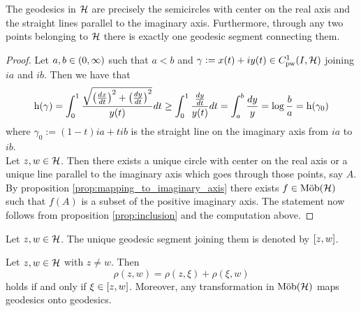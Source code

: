 \begin{theorem}
	The geodesics in $\mathcal{H}$ are precisely the semicircles with center on the real axis and the straight lines parallel to the imaginary axis. Furthermore, through any two points belonging to $\mathcal{H}$ there is exactly one geodesic segment connecting them. 
	\label{thm:geodesics}
\end{theorem}

\begin{proof}
	Let $a,b \in \intoo{0,\infty}$ such that $a < b$ and $\gamma := x(t) + iy(t) \in C^1_{\mathrm{pw}}(I,\mathcal{H})$ joining $ia$ and $ib$. Then we have that
	\begin{equation*}
		\h(\gamma) =  \int_0^1 \frac{\sqrt{\del[1]{\frac{dx}{dt}}^2 + \del[1]{\frac{dy}{dt}}^2}}{y(t)} dt \geq  \int_0^1 \frac{\frac{dy}{dt}}{y(t)} dt = \int_a^b \frac{dy}{y} = \log \frac{b}{a} = \h(\gamma_0)
	\end{equation*}
	\noindent where $\gamma_0 := (1 - t)ia + tib$ is the straight line on the imaginary axis from $ia$ to $ib$.\\
	Let $z,w \in \mathcal{H}$. Then there exists a unique circle with center on the real axis or a unique line parallel to the imaginary axis which goes through those points, say $A$. By proposition \ref{prop:mapping_to_imaginary_axis} there exists $f \in \mathrm{M\ddot{o}b}(\mathcal{H})$ such that $f(A)$ is a subset of the positive imaginary axis. The statement now follows from proposition \ref{prop:inclusion} and the computation above.
\end{proof}

\begin{definition}
	Let $z,w \in \mathcal{H}$. The unique geodesic segment joining them is denoted by $\sbr[0]{z,w}$.
\end{definition}

\begin{corollary}
	Let $z,w \in \mathcal{H}$ with $z \neq w$. Then
	\begin{equation}
		\rho(z,w) = \rho(z,\xi) + \rho(\xi,w)
	\end{equation}
	\noindent holds if and only if $\xi \in \sbr[0]{z,w}$. Moreover, any transformation in $\mathrm{M\ddot{o}b}(\mathcal{H})$ maps geodesics onto geodesics.
\end{corollary}

